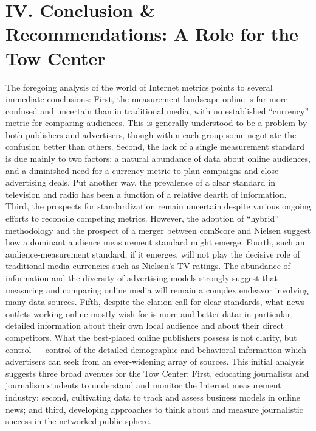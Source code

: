\chapter{IV. Conclusion & Recommendations: A Role for the Tow Center}
The foregoing analysis of the world of Internet metrics points to several
immediate conclusions:
First, the measurement landscape online is far more confused and
uncertain than in traditional media, with no established ``currency'' metric
for comparing audiences. This is generally understood to be a problem by
both publishers and advertisers, though within each group some negotiate
the confusion better than others.
Second, the lack of a single measurement standard is due mainly to two
factors: a natural abundance of data about online audiences, and a
diminished need for a currency metric to plan campaigns and close
advertising deals. Put another way, the prevalence of a clear standard in
television and radio has been a function of a relative dearth of
information.
Third, the prospects for standardization remain uncertain despite various
ongoing efforts to reconcile competing metrics. However, the adoption of
``hybrid'' methodology and the prospect of a merger between comScore
and Nielsen suggest how a dominant audience measurement standard
might emerge.
Fourth, such an audience‐measurement standard, if it emerges, will not
play the decisive role of traditional media currencies such as Nielsen’s TV
ratings. The abundance of information and the diversity of advertising
models strongly suggest that measuring and comparing online media will
remain a complex endeavor involving many data sources.
Fifth, despite the clarion call for clear standards, what news outlets
working online mostly wish for is more and better data: in particular,
detailed information about their own local audience and about their direct
competitors. What the best‐placed online publishers possess is not clarity,
but control — control of the detailed demographic and behavioral
information which advertisers can seek from an ever‐widening array of
sources.
This initial analysis suggests three broad avenues for the Tow Center:
First, educating journalists and journalism students to understand and
monitor the Internet measurement industry; second, cultivating data to
track and assess business models in online news; and third, developing
approaches to think about and measure journalistic success in the
networked public sphere.
